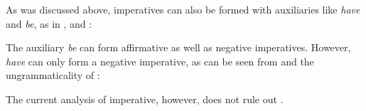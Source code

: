 As was discussed above, imperatives can also be formed with auxiliaries
like {\it have} and {\it be}, as in ,  and :


The auxiliary {\it be} can form affirmative as well as negative
imperatives. However, {\it have} can only form a negative imperative, as
can be seen from  and the ungrammaticality of :


The current analysis of imperative, however, does not rule out .










